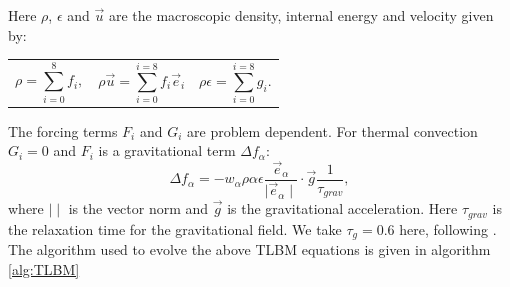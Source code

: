 \documentclass{article}
\begin{document}
Here $\rho$, $\epsilon$ and $\vec{u}$ are the macroscopic density, internal energy and velocity given by:

\begin{tabularx}{\textwidth}{XXX}
\begin{equation}
	\rho = \sum_{i=0}^{8} f_{i},
	\label{LBM rho}
\end{equation}
    &
\begin{equation}
	\rho \vec{u} = \sum_{i=0}^{i=8} f_{i} \vec{e}_{i}
	\label{LBM u}
\end{equation}
	&
\begin{equation}
	\rho \epsilon = \sum_{i=0}^{i=8} g_{i}.
	\label{LBM ep}
\end{equation}
\end{tabularx}\par

The forcing terms $F_i$ and $G_i$ are problem dependent. For thermal convection $G_i=0$ and $F_i$ is a gravitational term ${\Delta f}_{\alpha}$:
\begin{equation}
	{\Delta f}_{\alpha} = - w_{\alpha} \rho \alpha \epsilon \frac{\vec{e}_{\alpha}}{\mid \vec{e}_{\alpha} \mid} \cdot \vec{g} \frac{1}{\tau_{grav}},
\end{equation}
where $\mid \mid$ is the vector norm and $\vec{g}$ is the gravitational acceleration. Here $\tau_{grav}$ is the relaxation time for the gravitational field. We take $\tau_g=0.6$ here, following \cite{mora2017simulation}. The algorithm used to evolve the above TLBM equations is given in algorithm \ref{alg:TLBM}
\end{document}
